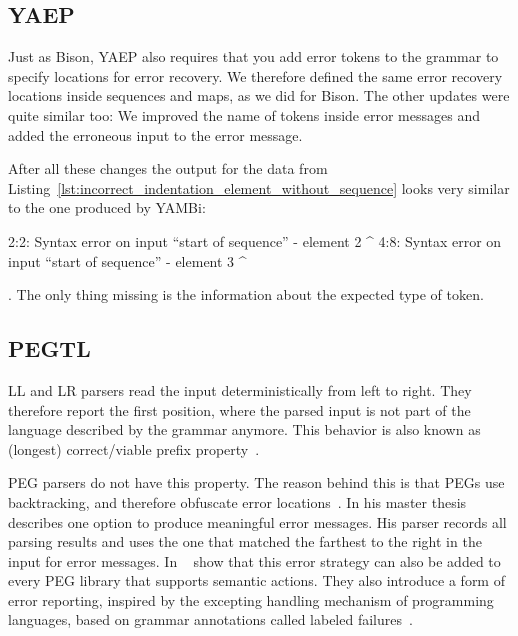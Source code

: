 \subsection{YAEP}

Just as Bison, \gls{YAEP} also requires that you add error tokens to the grammar to specify locations for error recovery. We therefore defined the same error recovery locations inside sequences and maps, as we did for Bison. The other updates were quite similar too: We improved the name of tokens inside error messages and added the erroneous input to the error message.

After all these changes the output for the  data from Listing~\ref{lst:incorrect_indentation_element_without_sequence} looks very similar to the one produced by YAMBi:

\begin{textcode}
2:2: Syntax error on input “start of sequence”
      - element 2
      ^
4:8: Syntax error on input “start of sequence”
            - element 3
            ^
\end{textcode}

. The only thing missing is the information about the expected type of token.

\subsection{PEGTL}

LL and LR parsers read the input deterministically from left to right. They therefore report the first position, where the parsed input is not part of the language described by the grammar anymore. This behavior is also known as (longest) correct/viable prefix property~\cite{sippu1990parsing, ruefenacht2016error, maidl2016labeled, pottier2016reachability}.

\Gls{PEG} parsers do not have this property. The reason behind this is that \glspl{PEG} use backtracking, and therefore obfuscate error locations~\cite{ruefenacht2016error}. In his master thesis~\cite{ford2002packrat} \citeauthor{ford2002packrat} describes one option to produce meaningful error messages. His parser records all parsing results and uses the one that matched the farthest to the right in the input for error messages. In ~\cite{maidl2016labeled} \citeauthor{maidl2016labeled} show that this error strategy can also be added to every \gls{PEG} library that supports semantic actions. They also introduce a form of error reporting, inspired by the excepting handling mechanism of programming languages, based on grammar annotations called labeled failures~\cite{maidl2016labeled}.

